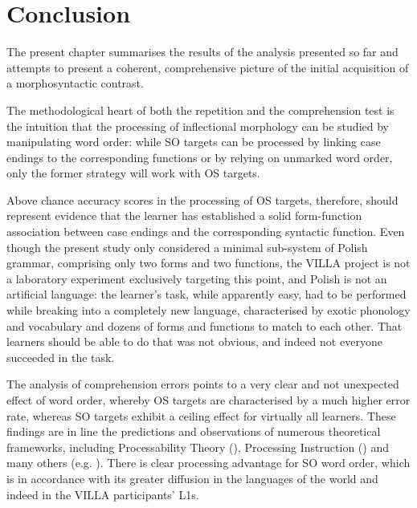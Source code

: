 \chapter{Conclusion}\label{sec:8}

The present chapter summarises the results of the analysis presented so far and attempts to present a coherent, comprehensive picture of the initial acquisition of a morphosyntactic contrast.

The methodological heart of both the repetition and the comprehension test is the intuition that the processing of inflectional morphology can be studied by manipulating word order: while SO targets can be processed by linking case endings to the corresponding functions or by relying on unmarked word order, only the former strategy will work with OS targets. 

\hspace*{-2pt}Above chance accuracy scores in the processing of OS targets, therefore, should represent evidence that the learner has established a solid form-function association between case endings and the corresponding syntactic function. Even though the present study only considered a minimal sub-system of Polish grammar, comprising only two forms and two functions, the VILLA project is not a laboratory experiment exclusively targeting this point, and Polish is not an artificial language: the learner’s task, while apparently easy, had to be performed while breaking into a completely new language, characterised by exotic phonology and vocabulary and dozens of forms and functions to match to each other. That learners should be able to do that was not obvious, and indeed not everyone succeeded in the task.

The analysis of comprehension errors points to a very clear and not unexpected effect of word order, whereby OS targets are characterised by a much higher error rate, whereas SO targets exhibit a ceiling effect for virtually all learners. These findings are in line the predictions and observations of numerous theoretical frameworks, including Processability Theory (\citealt{Pienemann1998, Baten2013, ArtoniMagnani2015}), Processing Instruction (\citealt{VanPatten1984, VanPatten1996, VanPattenEtAl2013}) and many others (e.g. \citealt{KempeMacWhinney1998, Jackson2007, HenryEtAl2009, Rankin2014}). There is clear processing advantage for SO word order, which is in accordance with its greater diffusion in the languages of the world and indeed in the VILLA participants’ L1s.


